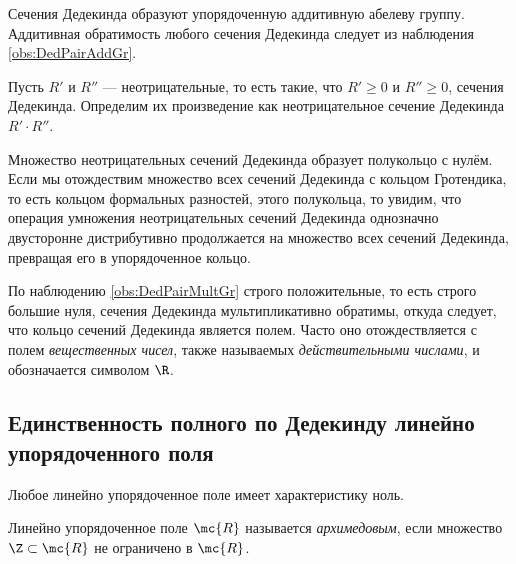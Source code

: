 \documentclass[
	extrafontsizes,
	11pt,
	hyphens,
]{memoir}
\begin{document}
\begin{observation}
Сечения Дедекинда образуют упорядоченную аддитивную абелеву группу. Аддитивная обратимость любого сечения Дедекинда следует из наблюдения \ref{obs:DedPairAddGr}.
\end{observation}

\begin{definition}
Пусть \(R'\) и \(R''\) --- неотрицательные, то есть такие, что \(R' \geq 0\) и \(R'' \geq 0\), сечения Дедекинда.
Определим их произведение как неотрицательное сечение Дедекинда
\(R' \cdot R''\).
\end{definition}

\begin{observation}
Множество неотрицательных сечений Дедекинда образует полукольцо с нулём. Если мы отождествим множество всех сечений Дедекинда с кольцом Гротендика, то есть кольцом формальных разностей, этого полукольца, то увидим, что операция умножения
неотрицательных сечений Дедекинда
однозначно двусторонне дистрибутивно продолжается на множество всех сечений Дедекинда, превращая его в упорядоченное кольцо.
\end{observation}

\begin{observation}
По наблюдению \ref{obs:DedPairMultGr} строго положительные, то есть строго большие нуля, сечения Дедекинда мультипликативно обратимы, откуда следует, что кольцо сечений Дедекинда является полем.
Часто оно отождествляется с полем \emph{вещественных чисел}, также называемых \emph{действительными числами}, и обозначается символом \(\R\).
\end{observation}

\subsection{Единственность полного по Дедекинду линейно упорядоченного поля}

\begin{observation}
Любое линейно упорядоченное поле имеет характеристику ноль.
\end{observation}

\begin{definition}[\scshape Архимедово поле]
Линейно упорядоченное поле \(\mc{R}\) называется \emph{архимедовым}, если множество \(\Z \subset \mc{R}\) не ограничено в \(\mc{R}\).
\end{definition}
\end{document}
